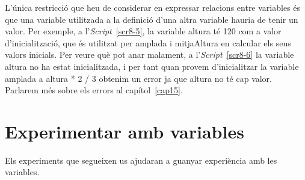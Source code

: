 \noindent
L'única restricció que heu de considerar en expressar relacions entre variables és que una variable utilitzada a la definició d'una altra variable hauria de tenir un valor. Per exemple, a l'\emph{Script}~\ref{scr8-5}, la variable \textsf{altura} té \textsf{120} com a valor d'inicialització, que és utilitzat per \textsf{amplada} i \textsf{mitjaAltura} en calcular els seus valors inicials. Per veure què pot anar malament, a l'\emph{Script}~\ref{scr8-6} la variable \textsf{altura} no ha estat inicialitzada, i per tant quan provem d'inicialitzar la variable \textsf{amplada} a \textsf{altura * 2 / 3} obtenim un error ja que \textsf{altura} no té cap valor. Parlarem més sobre els errors al capítol~\ref{cap15}. 

\section{Experimentar amb variables}
Els experiments que segueixen us ajudaran a guanyar experiència amb les variables.

